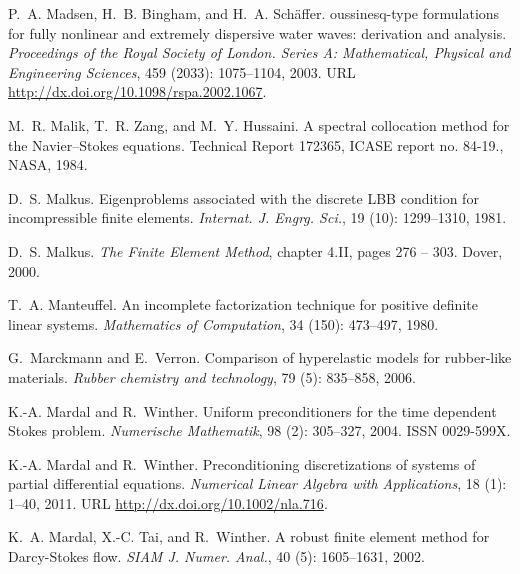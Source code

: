 \begin{thebibliography}{467}
P.~A. Madsen, H.~B. Bingham, and H.~A. Sch{\"a}ffer.
oussinesq-type formulations for fully nonlinear and extremely
  dispersive water waves: derivation and analysis.
\newblock \emph{Proceedings of the Royal Society of London. Series A:
  Mathematical, Physical and Engineering Sciences}, 459
  (2033): 1075--1104, 2003.
\newblock URL \url{http://dx.doi.org/10.1098/rspa.2002.1067}.

M.~R. Malik, T.~R. Zang, and M.~Y. Hussaini.
\newblock A spectral collocation method for the {N}avier--{S}tokes equations.
\newblock Technical Report 172365, ICASE report no. 84-19., NASA, 1984.

D.~S. Malkus.
\newblock Eigenproblems associated with the discrete {LBB} condition for
  incompressible finite elements.
\newblock \emph{Internat. J. Engrg. Sci.}, 19 (10):
  1299--1310, 1981.

D.~S. Malkus.
\newblock \emph{The Finite Element Method}, chapter 4.II, pages 276 -- 303.
\newblock Dover, 2000.

T.~A. Manteuffel.
\newblock An incomplete factorization technique for positive definite linear
  systems.
\newblock \emph{Mathematics of Computation}, 34 (150):
  473--497, 1980.

G.~Marckmann and E.~Verron.
\newblock Comparison of hyperelastic models for rubber-like materials.
\newblock \emph{Rubber chemistry and technology}, 79 (5):
  835--858, 2006.

K.-A. Mardal and R.~Winther.
\newblock Uniform preconditioners for the time dependent {S}tokes problem.
\newblock \emph{Numerische Mathematik}, 98 (2): 305--327,
  2004.
\newblock ISSN 0029-599X.

K.-A. Mardal and R.~Winther.
\newblock Preconditioning discretizations of systems of partial differential
  equations.
\newblock \emph{Numerical Linear Algebra with Applications}, 18
  (1): 1--40, 2011.
\newblock URL \url{http://dx.doi.org/10.1002/nla.716}.

K.~A. Mardal, X.-C. Tai, and R.~Winther.
\newblock A robust finite element method for {D}arcy-{S}tokes flow.
\newblock \emph{SIAM J. Numer. Anal.}, 40 (5): 1605--1631,
  2002.


\end{thebibliography}
